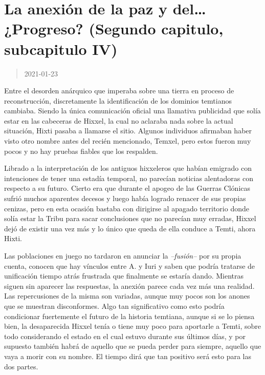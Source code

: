 \documentclass[
  spanish,
]{book}
\begin{document}
\hypertarget{la-anexiuxf3n-de-la-paz-y-del-progreso-segundo-capitulo-subcapitulo-iv}{%
\section{La anexión de la paz y del\ldots{} ¿Progreso? (Segundo capitulo, subcapitulo IV)}\label{la-anexiuxf3n-de-la-paz-y-del-progreso-segundo-capitulo-subcapitulo-iv}}

\begin{quote}
2021-01-23
\end{quote}

Entre el desorden anárquico que imperaba sobre una tierra en proceso de reconstrucción, discretamente la identificación de los dominios temtianos cambiaba. Siendo la única comunicación oficial una llamativa publicidad que solía estar en las cabeceras de Hixxel, la cual no aclaraba nada sobre la actual situación, Hixti pasaba a llamarse el sitio. Algunos individuos afirmaban haber visto otro nombre antes del recién mencionado, Temxel, pero estos fueron muy pocos y no hay pruebas fiables que los respalden.

Librado a la interpretación de los antiguos hixxeleros que habían emigrado con intenciones de tener una estadía temporal, no parecían noticias alentadoras con respecto a su futuro. Cierto era que durante el apogeo de las Guerras Clónicas sufrió muchos aparentes decesos y luego había logrado renacer de sus propias cenizas, pero en esta ocasión bastaba con dirigirse al apagado territorio donde solía estar la Tribu para sacar conclusiones que no parecían muy erradas, Hixxel dejó de existir una vez más y lo único que queda de ella conduce a Temti, ahora Hixti.

Las poblaciones en juego no tardaron en anunciar la \emph{--fusión--} por su propia cuenta, conocen que hay vínculos entre A. y Iuri y saben que podría tratarse de unificación tiempo atrás frustrada que finalmente se estaría dando. Mientras siguen sin aparecer las respuestas, la anexión parece cada vez más una realidad. Las repercusiones de la misma son variadas, aunque muy pocos son los anones que se muestran disconformes. Algo tan significativo como esto podría condicionar fuertemente el futuro de la historia temtiana, aunque si se lo piensa bien, la desaparecida Hixxel tenía o tiene muy poco para aportarle a Temti, sobre todo considerando el estado en el cual estuvo durante sus últimos días, y por supuesto también habrá de aquello que se pueda perder para siempre, aquello que vaya a morir con su nombre. El tiempo dirá que tan positivo será esto para las dos partes.
\end{document}
